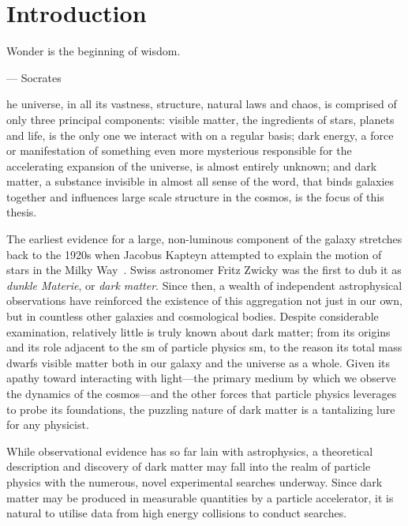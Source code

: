 %
%
\chapter{Introduction}  %
\label{chap:intro}


\epigraph{\hfill Wonder is the beginning of wisdom.}{--- Socrates}  %

he universe, in all its vastness, structure, natural laws and chaos, is comprised of only three principal components: visible matter, the ingredients of stars, planets and life, is the only one we interact with on a regular basis; dark energy, a force or manifestation of something even more mysterious responsible for the accelerating expansion of the universe, is almost entirely unknown; and dark matter, a substance invisible in almost all sense of the word, that binds galaxies together and influences large scale structure in the cosmos, is the focus of this thesis.

The earliest evidence for a large, non-luminous component of the galaxy stretches back to the 1920s when Jacobus Kapteyn attempted to explain the motion of stars in the Milky Way~\cite{1922ApJ....55..302K}. Swiss astronomer Fritz Zwicky was the first to dub it as \emph{dunkle Materie}, or \emph{dark matter}. Since then, a wealth of independent astrophysical observations have reinforced the existence of this aggregation not just in our own, but in countless other galaxies and cosmological bodies. Despite considerable examination, relatively little is truly known about dark matter; from its origins and its role adjacent to the \acrlong{sm} of particle physics \acrshort{sm}, to the reason its total mass dwarfs visible matter both in our galaxy and the universe as a whole. Given its apathy toward interacting with light---the primary medium by which we observe the dynamics of the cosmos---and the other forces that particle physics leverages to probe its foundations, the puzzling nature of dark matter is a tantalizing lure for any physicist.

While observational evidence has so far lain with astrophysics, a theoretical description and discovery of dark matter may fall into the realm of particle physics with the numerous, novel experimental searches underway. Since dark matter may be produced in measurable quantities by a particle accelerator, it is natural to utilise data from high energy collisions to conduct searches.

